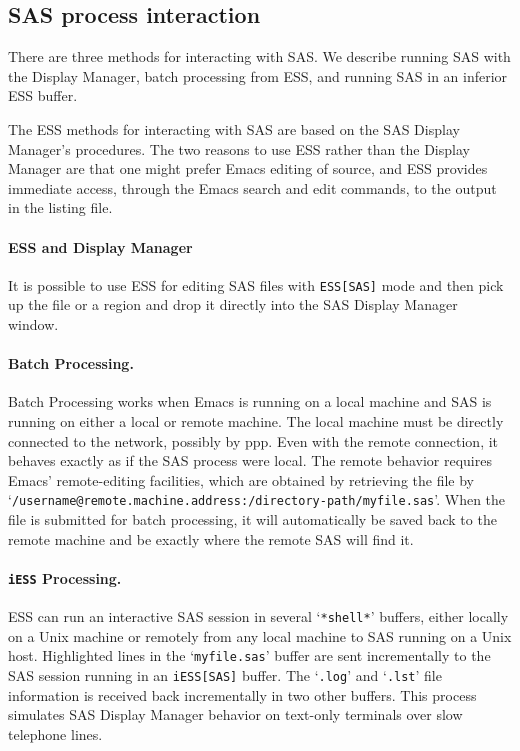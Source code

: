 \documentclass{article}
\newcommand{\stexttt}[1]{{\small\texttt{#1}}}
\newcommand{\ssf}[1]{{\small\sf{#1}}}
\newcommand{\file}[1]{`\stexttt{#1}'}
\begin{document}
\subsection{SAS process interaction}
\label{sec:SAS:proc}

There are three methods for interacting with SAS.  We describe running
SAS with the Display Manager, batch processing from ESS, and running
SAS in an inferior ESS buffer.

The ESS methods for interacting with SAS are based on the SAS Display
Manager's procedures.  The two reasons to use ESS rather than the
Display Manager are that one might prefer Emacs editing of source, and
ESS provides immediate access, through the Emacs search and edit
commands, to the output in the listing file.

\paragraph{ESS and Display Manager}
It is possible to use ESS for editing SAS files with
\stexttt{ESS[SAS]} mode and then pick up the file or a region and drop
it directly into the SAS Display Manager \ssf{Program Editor} window.

\paragraph{Batch Processing.}
Batch Processing works when Emacs is running on a local machine and
SAS is running on either a local or remote machine.  The local machine
must be directly connected to the network, possibly by ppp.  Even with
the remote connection, it behaves exactly as if the SAS process were
local.  The remote behavior requires Emacs' remote-editing facilities,
which are obtained by retrieving the file by
\file{/username@remote.machine.address:/directory-path/myfile.sas}.
When the file is submitted for batch processing, it will automatically
be saved back to the remote machine and be exactly where the remote
SAS will find it.

\paragraph{\stexttt{iESS} Processing.}
ESS can run an interactive SAS session in several \file{*shell*}
buffers, either locally on a Unix machine or remotely from any local
machine to SAS running on a Unix host.  Highlighted lines in the
\file{myfile.sas} buffer are sent incrementally to the SAS session
running in an \stexttt{iESS[SAS]} buffer.  The \file{.log} and
\file{.lst} file information is received back incrementally in two
other buffers.  This process simulates SAS Display Manager behavior on
text-only terminals over slow telephone lines.
\end{document}

